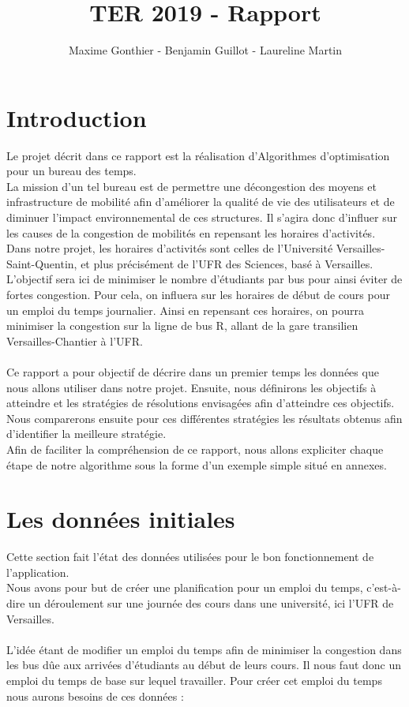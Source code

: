 \documentclass[a4paper,11pt]{article}
\title{TER 2019 - Rapport}
\author{Maxime Gonthier - Benjamin Guillot - Laureline Martin}
\begin{document}
\clearpage
\maketitle

\newpage
\tableofcontents

\newpage
\section{Introduction}
	Le projet décrit dans ce rapport est la réalisation d'Algorithmes d'optimisation pour un bureau des temps.\\
	La mission d'un tel bureau est de permettre une décongestion des moyens et infrastructure de mobilité afin d'améliorer la qualité de vie des utilisateurs et de diminuer l'impact environnemental de ces structures. Il s'agira donc d'influer sur les causes de la congestion de mobilités en repensant les horaires d'activités.\\
	Dans notre projet, les horaires d'activités sont celles de l'Université Versailles-Saint-Quentin, et plus précisément de l'UFR des Sciences, basé à Versailles. L'objectif sera ici de minimiser le nombre d'étudiants par bus pour ainsi éviter de fortes congestion. Pour cela, on influera sur les horaires de début de cours pour un emploi du temps journalier. Ainsi en repensant ces horaires, on pourra minimiser la congestion sur la ligne de bus R, allant de la gare transilien Versailles-Chantier à l'UFR.\\
	\\
	Ce rapport a pour objectif de décrire dans un premier temps les données que nous allons utiliser dans notre projet. Ensuite, nous définirons les objectifs à atteindre et les stratégies de résolutions envisagées afin d'atteindre ces objectifs. Nous comparerons ensuite pour ces différentes stratégies les résultats obtenus afin d'identifier la meilleure stratégie.\\
	Afin de faciliter la compréhension de ce rapport, nous allons expliciter chaque étape de notre algorithme sous la forme d'un exemple simple situé en annexes.
	
\section{Les données initiales}
	Cette section fait l'état des données utilisées pour le bon fonctionnement de l'application.\\
	Nous avons pour but de créer une planification pour un emploi du temps, c'est-à-dire un déroulement sur une journée des cours dans une université, ici l'UFR de Versailles.\\
	\\
	L'idée étant de modifier un emploi du temps afin de minimiser la congestion dans les bus dûe aux arrivées d'étudiants au début de leurs cours. Il nous faut donc un emploi du temps de base sur lequel travailler. Pour créer cet emploi du temps nous aurons besoins de ces données : \\
\end{document}
